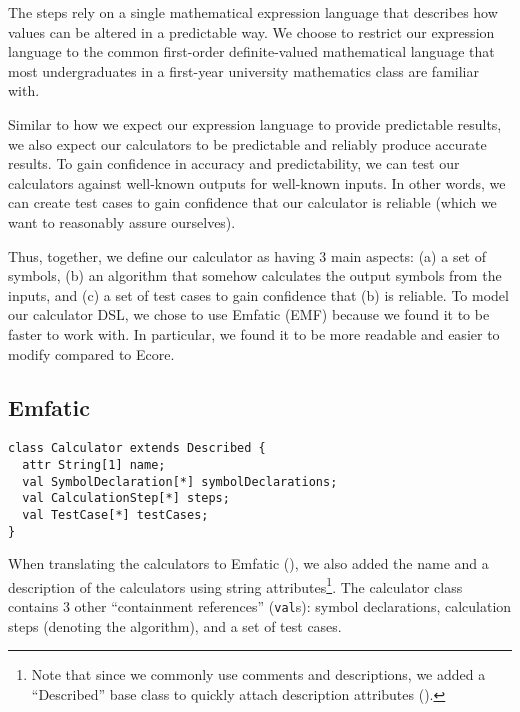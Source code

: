 \documentclass[11pt,fleqn]{article}
\begin{document}
The steps rely on a single mathematical expression language that describes how
values can be altered in a predictable way. We choose to restrict our expression
language to the common first-order definite-valued mathematical language that
most undergraduates in a first-year university mathematics class are familiar
with.

Similar to how we expect our expression language to provide predictable results,
we also expect our calculators to be predictable and reliably produce accurate
results. To gain confidence in accuracy and predictability, we can test our
calculators against well-known outputs for well-known inputs. In other words, we
can create test cases to gain confidence that our calculator is reliable (which
we want to reasonably assure ourselves).

Thus, together, we define our calculator as having 3 main aspects: (a) a set of
symbols, (b) an algorithm that somehow calculates the output symbols from the
inputs, and (c) a set of test cases to gain confidence that (b) is reliable. To
model our calculator DSL, we chose to use Emfatic (EMF) because we found it to
be faster to work with. In particular, we found it to be more readable and
easier to modify compared to Ecore.

\subsection{Emfatic}
\label{sec:modelling:subsec:emfatic}

\begin{lstlisting}[caption={Calculator EMF},label={lst:calculator}]
class Calculator extends Described {
  attr String[1] name;
  val SymbolDeclaration[*] symbolDeclarations;
  val CalculationStep[*] steps;
  val TestCase[*] testCases;
}
\end{lstlisting}

When translating the calculators to Emfatic (), we also
added the name and a description of the calculators using string
attributes\footnote{Note that since we commonly use comments and descriptions,
we added a ``Described'' base class to quickly attach description attributes
().}. The calculator class contains 3 other ``containment
references'' (\lstinline{val}s): symbol declarations, calculation steps
(denoting the algorithm), and a set of test cases.

\newpage{}

\end{document}
